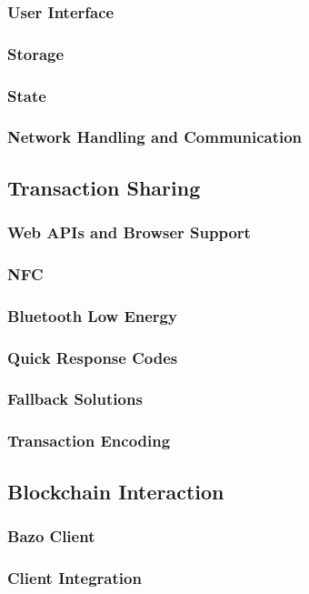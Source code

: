 \documentclass[a4paper]{article}
\begin{document}
\subsubsection{User Interface}
\subsubsection{Storage}
\subsubsection{State}
\subsubsection{Network Handling and Communication}

\subsection{Transaction Sharing}
\subsubsection{Web APIs and Browser Support}
\subsubsection{NFC}
\subsubsection{Bluetooth Low Energy}
\subsubsection{Quick Response Codes}
\subsubsection{Fallback Solutions}
\subsubsection{Transaction Encoding}

\subsection{Blockchain Interaction}
\subsubsection{Bazo Client}
\subsubsection{Client Integration}
\end{document}

